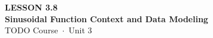 \documentclass[aspectratio=169, 11pt]{beamer}
\begin{document}
{
\begin{frame}[plain]
  \vspace{2.8cm}\hspace{0.55cm}%
  \begin{minipage}{0.9\textwidth}
    {\color{goldacc}\bfseries\small LESSON 3.8}\\[0.5cm]
    {\color{white}\bfseries\LARGE Sinusoidal Function Context and Data Modeling}\\[1.2cm]
    {\color{skymid}\small TODO Course~$\cdot$~Unit 3}
  \end{minipage}
\end{frame}
}

\begin{frame}[t, plain]
\end{frame}
\end{document}
